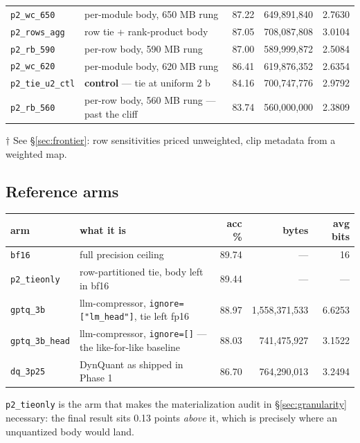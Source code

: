 \documentclass[11pt]{article}
\newcommand{\code}[1]{\texttt{#1}}
\begin{document}
\begin{center}
\begin{tabular}{@{}llrrr@{}}
\code{p2\_wc\_650} & per-module body, 650 MB rung & 87.22 & 649{,}891{,}840 & 2.7630 \\
\code{p2\_rows\_agg} & row tie + rank-product body & 87.05 & 708{,}087{,}808 & 3.0104 \\
\code{p2\_rb\_590} & per-row body, 590 MB rung & 87.00 & 589{,}999{,}872 & 2.5084 \\
\code{p2\_wc\_620} & per-module body, 620 MB rung & 86.41 & 619{,}876{,}352 & 2.6354 \\
\rowcolor{ctlbg}
\code{p2\_tie\_u2\_ctl} & \textbf{control} --- tie at uniform 2 b & 84.16 & 700{,}747{,}776 & 2.9792 \\
\code{p2\_rb\_560} & per-row body, 560 MB rung --- past the cliff & 83.74 & 560{,}000{,}000 & 2.3809 \\
\bottomrule
\end{tabular}
\end{center}

$\dagger$ See \S\ref{sec:frontier}: row sensitivities priced unweighted, clip metadata from a
weighted map.

\subsection{Reference arms}

\begin{center}\footnotesize
\begin{tabular}{@{}llrrr@{}}
\toprule
arm & what it is & acc \% & bytes & avg bits \\
\midrule
\code{bf16} & full precision ceiling & 89.74 & --- & 16 \\
\code{p2\_tieonly} & row-partitioned tie, body left in bf16 & 89.44 & --- & --- \\
\code{gptq\_3b} & llm-compressor, \code{ignore=["lm\_head"]}, tie left fp16 & 88.97 & 1{,}558{,}371{,}533 & 6.6253 \\
\code{gptq\_3b\_head} & llm-compressor, \code{ignore=[]} --- the like-for-like baseline & 88.03 & 741{,}475{,}927 & 3.1522 \\
\code{dq\_3p25} & DynQuant as shipped in Phase 1 & 86.70 & 764{,}290{,}013 & 3.2494 \\
\bottomrule
\end{tabular}
\end{center}

\code{p2\_tieonly} is the arm that makes the materialization audit in \S\ref{sec:granularity}
necessary: the final result sits 0.13 points \emph{above} it, which is precisely where an
unquantized body would land.
\end{document}
